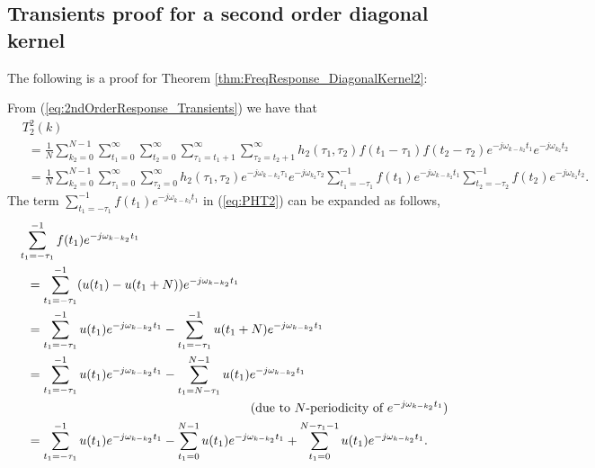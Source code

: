 \begin{subappendices}
\section{Transients proof for a second order diagonal kernel}
\label{append:DiagonalKernelProof}

\allowdisplaybreaks

The following is a proof for Theorem \ref{thm:FreqResponse_DiagonalKernel2}:

From (\ref{eq:2ndOrderResponse_Transients}) we have that
\begin{align}
&T_2^2(k) \nonumber \\
& \ \ = \frac{1}{N} \sum\limits_{k_2=0}^{N-1} \sum\limits_{t_1=0}^{\infty} \sum\limits_{t_2=0}^{\infty} \sum\limits_{\tau_1=t_1+1}^{\infty} \sum\limits_{\tau_2=t_2+1}^{\infty} h_2(\tau_1,\tau_2) f(t_1-\tau_1) f(t_2-\tau_2) e^{-j \omega_{k-k_2}t_1} e^{-j \omega_{k_2} t_2} \nonumber \\
& \ \ = \frac{1}{N} \sum\limits_{k_2=0}^{N-1} \sum\limits_{\tau_1=0}^{\infty} \sum\limits_{\tau_2=0}^{\infty} h_2(\tau_1,\tau_2) e^{-j \omega_{k-k_2}\tau_1} e^{-j \omega_{k_2} \tau_2} \sum\limits_{t_1=-\tau_1}^{-1} f(t_1) e^{-j \omega_{k-k_2}t_1}\sum\limits_{t_2=-\tau_2}^{-1} f(t_2) e^{-j \omega_{k_2} t_2}. \label{eq:PHT2}
\end{align}
The term $\sum\limits_{t_1=-\tau_1}^{-1} f(t_1) e^{-j \omega_{k-k_2}t_1}$ in (\ref{eq:PHT2}) can be expanded as follows,
\begin{align}
& \sum\limits_{t_1=-\tau_1}^{-1} f(t_1) e^{-j \omega_{k-k_2}t_1} \nonumber \\
& \ \ = \sum\limits_{t_1=-\tau_1}^{-1} (u(t_1) - u(t_1 + N)) e^{-j \omega_{k-k_2} t_1} \nonumber \\
& \ \ = \sum\limits_{t_1=-\tau_1}^{-1} u(t_1) e^{-j \omega_{k-k_2} t_1} - \sum\limits_{t_1=-\tau_1}^{-1} u(t_1 + N) e^{-j \omega_{k-k_2} t_1} \nonumber \\
& \ \ = \sum\limits_{t_1=-\tau_{1}}^{-1} u(t_1) e^{-j \omega_{k-k_2} t_1} - \sum\limits_{t_1=N-\tau_{1}}^{N-1} u(t_1) e^{-j \omega_{k-k_2} t_1} \nonumber \\
& \hspace{6.5cm} (\textrm{due to $N$-periodicity of } e^{-j \omega_{k-k_2} t_1}) \nonumber \\
& \ \ = \sum\limits_{t_1=-\tau_{1}}^{-1} u(t_1) e^{-j \omega_{k-k_2} t_1} - \sum\limits_{t_1=0}^{N-1} u(t_1) e^{-j \omega_{k-k_2} t_1} + \sum\limits_{t_1=0}^{N-\tau_1-1} u(t_1) e^{-j \omega_{k-k_2} t_1}. \label{eq:PHT6}

\end{align}
\end{subappendices}
